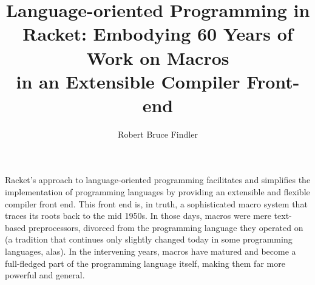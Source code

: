 \documentclass[runningheads]{llncs}
\begin{document}
\title{Language-oriented Programming in Racket: Embodying 60 Years of Work on Macros\\in an Extensible Compiler Front-end}
\author{Robert Bruce Findler}
%
\maketitle              %


Racket's approach to language-oriented programming facilitates and
simplifies the implementation of programming languages by providing an
extensible and flexible compiler front end. This front end is, in
truth, a sophisticated macro system that traces its roots back to the
mid 1950s. In those days, macros were mere text-based preprocessors,
divorced from the programming language they operated on (a tradition
that continues only slightly changed today in some programming
languages, alas). In the intervening years, macros have matured and
become a full-fledged part of the programming language itself, making
them far more powerful and general.
\end{document}
